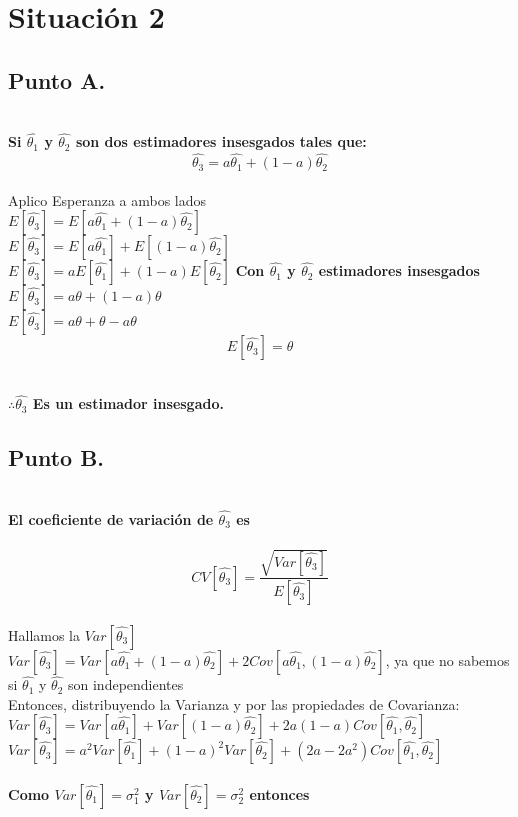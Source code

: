 \documentclass[letterpaper,12pt,onecolumn,titlepage]{article}
\begin{document}
\pagebreak \section{Situaci\'{o}n 2}
\subsection{Punto A.}
~\\\textbf{Si $\hat{\theta_1}$ y $\hat{\theta_2}$ son dos estimadores insesgados tales que:
~\\$$\hat{\theta_3}=a{\hat{\theta_1}}+(1-a){\hat{\theta_2}}$$}
~\\ Aplico Esperanza a ambos lados 
~\\ $E[\hat{\theta_3}] = E[a{\hat{\theta_1}}+(1-a){\hat{\theta_2}}]$
~\\ $E[\hat{\theta_3}] = E[a{\hat{\theta_1}}]+E[(1-a){\hat{\theta_2}}]$
~\\ $E[\hat{\theta_3}] = aE[{\hat{\theta_1}}]+(1-a)E[{\hat{\theta_2}}]$ \textbf{Con $\hat{\theta_1}$ y $\hat{\theta_2}$ estimadores insesgados}\
~\\ $E[\hat{\theta_3}] = a{\theta} + (1-a){\theta}$
~\\ $E[\hat{\theta_3}] = a{\theta} + {\theta} - a{\theta}$
~\\ $$E[\hat{\theta_3}]={\theta}$$

~\\\textbf{$\therefore \hat{\theta_3}$ Es un estimador insesgado.} 
 


\subsection{Punto B.} 

~\\\textbf{ El coeficiente de variaci\'{o}n de $\hat{\theta_3}$ es}
~\\
~\\ $$CV[\hat{\theta_3}]=\frac{\sqrt{Var[\hat{\theta_3}]}}{E[\hat{\theta_3}]}$$
~\\ Hallamos la $Var[\hat{\theta_3}]$
~\\ $Var[\hat{\theta_3}]=Var[a{\hat{\theta_1}}+(1-a){\hat{\theta_2}}]+2Cov[a{\hat{\theta_1}},(1-a){\hat{\theta_2}}]$,    ya que no sabemos si ${\hat{\theta_1}}$ y ${\hat{\theta_2}}$ son independientes
~\\ Entonces, distribuyendo la Varianza y por las propiedades de Covarianza:
~\\ $Var[\hat{\theta_3}]=Var[a{\hat{\theta_1}}]+Var[(1-a){\hat{\theta_2}}]+2a(1-a) Cov[{\hat{\theta_1}},{\hat{\theta_2}}]$
~\\ $Var[\hat{\theta_3}]=a^2Var[{\hat{\theta_1}}]+(1-a)^2Var[{\hat{\theta_2}}]+(2a-2a^2)Cov[{\hat{\theta_1}},{\hat{\theta_2}}]$
~\\
~\\\textbf{Como $Var[{\hat{\theta_1}}]=\sigma_1^2$ y $Var[{\hat{\theta_2}}]=\sigma_2^2$ entonces}
\end{document}
